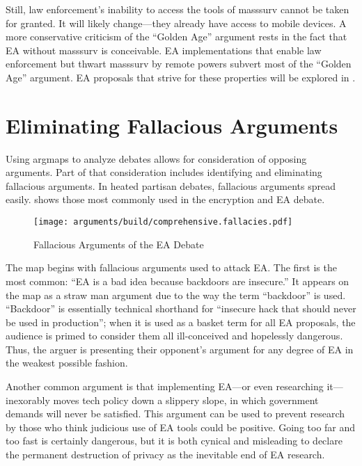 Still, law enforcement's inability to access the tools of \ac{masssurv} cannot be taken for granted. It will likely
change---they already have access to mobile devices. A more conservative criticism of the ``Golden Age'' argument rests
in the fact that \ac{EA} without \ac{masssurv} is conceivable. \ac{EA} implementations that enable law enforcement but
thwart \ac{masssurv} by remote powers subvert most of the ``Golden Age'' argument. \ac{EA} proposals that strive for
these properties will be explored in .


\section{Eliminating Fallacious Arguments}

Using \acp{argmap} to analyze debates allows for consideration of opposing arguments. Part of that consideration
includes identifying and eliminating fallacious arguments. In heated partisan debates, fallacious arguments spread
easily.  shows those most commonly used in the encryption and \ac{EA} debate.

\begin{figure}[t!]
  \centering\CaptionFontSize
  \texttt{[image: arguments/build/comprehensive.fallacies.pdf]}
  \caption{Fallacious Arguments of the EA Debate}
  \label{fig-arg-fallacies}
\end{figure}

The map begins with fallacious arguments used to attack \ac{EA}. The first is the most common: ``\ac{EA} is a bad idea
because backdoors are insecure.'' It appears on the map as a straw man argument due to the way the term ``backdoor'' is
used. ``Backdoor'' is essentially technical shorthand for ``insecure hack that should never be used in production'';
when it is used as a basket term for all \ac{EA} proposals, the audience is primed to consider them all ill-conceived
and hopelessly dangerous. Thus, the arguer is presenting their opponent's argument for any degree of \ac{EA} in the
weakest possible fashion.

Another common argument is that implementing \ac{EA}---or even researching it---inexorably moves tech policy down a
slippery slope, in which government demands will never be satisfied. This argument can be used to prevent research by
those who think judicious use of \ac{EA} tools could be positive. Going too far and too fast is certainly dangerous, but
it is both cynical and misleading to declare the permanent destruction of privacy as the inevitable end of \ac{EA}
research.

